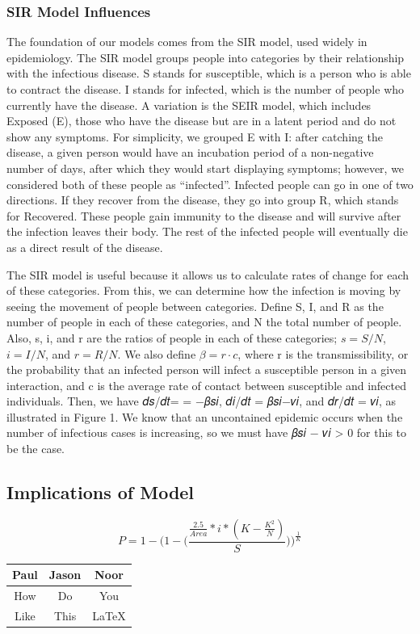 \documentclass[12pt]{article}
\begin{document}
\subsubsection{SIR Model Influences}

The foundation of our models comes from the SIR model, used widely in epidemiology. The SIR model groups people into categories by their relationship with the infectious disease. S stands for susceptible, which is a person who is able to contract the disease. I stands for infected, which is the number of people who currently have the disease. A variation is the SEIR model, which includes Exposed (E), those who have the disease but are in a latent period and do not show any symptoms. For simplicity, we grouped E with I: after catching the disease, a given person would have an incubation period of a non-negative number of days, after which they would start displaying symptoms; however, we considered both of these people as “infected”. Infected people can go in one of two directions. If they recover from the disease, they go into group R, which stands for Recovered. These people gain immunity to the disease and will survive after the infection leaves their body. The rest of the infected people will eventually die as a direct result of the disease.

The SIR model is useful because it allows us to calculate rates of change for each of these categories. From this, we can determine how the infection is moving by seeing the movement of people between categories. Define S, I, and R as the number of people in each of these categories, and N the total number of people. Also, s, i, and r are the ratios of people in each of these categories; \(s=S/N\), \(i=I/N\), and \(r=R/N\). We also define \(\beta = r·c\), where r is the transmissibility, or the probability that an infected person will infect a susceptible person in a given interaction, and c is the average rate of contact between susceptible and infected individuals. Then, we have 𝑑𝑠/𝑑𝑡= = −𝛽𝑠𝑖, 𝑑𝑖/𝑑𝑡 = 𝛽𝑠𝑖−𝑣𝑖, and 𝑑𝑟/𝑑𝑡 = 𝑣𝑖, as illustrated in Figure 1. We know that an uncontained epidemic occurs when the number of infectious cases is increasing, so we must have 𝛽𝑠𝑖 − 𝜈𝑖 > 0 for this to be the case.

\subsection{Implications of Model}

\begin{center}
\[
P=1-\bigg(1-\Big(\frac{\frac{2.5}{Area}*i*(K-\frac{K^2}{N})}{S}\Big)\bigg)^\frac{1}{K}
\]


\begin{tabular}{c || c | c}
\hline
Paul & Jason & Noor \\
\hline
How & Do & You \\
\hline
Like & This & LaTeX \\
\hline
\end{tabular}

\end{center}
\end{document}
